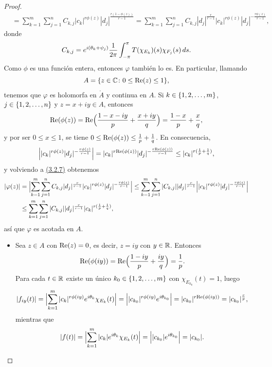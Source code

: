 \documentclass[a4paper, 12pt]{book}
\begin{document}
\begin{proof}
\begin{align}
        &= \sum_{k=1}^m \sum_{j=1}^n C_{k,j} |c_k|^{r\phi(z)} |d_j|^{\frac{r(1-\phi(z))}{r-1}} = \sum_{k=1}^m \sum_{j=1}^n C_{k,j}|d_j|^{\frac{r}{r-1}} |c_k|^{r\phi(z)} |d_j|^{-\frac{r\phi(z)}{r-1}},
    \end{align}
    donde
    \[C_{k,j} = e^{i(\theta_k+\psi_j)}\frac{1}{2\pi}\integral[s]{-\pi}{\pi}{T(\chi_{E_k})(s)\chi_{F_j}(s)}.\]
    Como $\phi$ es una función entera, entonces $\varphi$ también lo es. En particular, llamando
    \[A = \{z \in \C \colon 0 \leq \real(z) \leq 1\},\]
    tenemos que $\varphi$ es holomorfa en $\mathring{A}$ y continua en $A$. Si $k\in \{1,2,\mathellipsis,m\}$, $j \in \{1,2,\mathellipsis,n\}$ y  $z =x+iy\in A$, entonces
    \[\real(\phi(z)) = \real\Bigl(\frac{1-x-iy}{p}+\frac{x+iy}{q}\Bigr) = \frac{1-x}{p}+\frac{x}{q},\]
    y por ser $0 \leq x \leq 1$, se tiene $0 \leq \real(\phi(z)) \leq \frac{1}{p}+\frac{1}{q}$. En consecuencia,
    \begin{align*}
        \Bigl||c_k|^{r\phi(z)} |d_j|^{-\frac{r\phi(z)}{r-1}}\Bigr| = |c_k|^{r\real(\phi(z))}|d_j|^{-\frac{r\real(\phi(z))}{r-1}} \leq |c_k|^{r(\frac{1}{p}+\frac{1}{q})},
    \end{align*} 
    y volviendo a \hyperref[3.2.7]{(3.2.7)} obtenemos
    \begin{align*}
        |\varphi(z)| &= \Bigl|\sum_{k=1}^m \sum_{j=1}^n C_{k,j}|d_j|^{\frac{r}{r-1}} |c_k|^{r\phi(z)} |d_j|^{-\frac{r\phi(z)}{r-1}}\Bigr| \leq\sum_{k=1}^m \sum_{j=1}^n |C_{k,j}||d_j|^{\frac{r}{r-1}} \Bigl||c_k|^{r\phi(z)} |d_j|^{-\frac{r\phi(z)}{r-1}}\Bigr| \\
        &\leq\sum_{k=1}^m \sum_{j=1}^n |C_{k,j}||d_j|^{\frac{r}{r-1}} |c_k|^{r(\frac{1}{p}+\frac{1}{q})},
    \end{align*}
    así que $\varphi$ es acotada en $A$.
    \begin{itemize}
        \item Sea $z \in A$ con $\real(z) = 0$, es decir, $z = iy$ con $y \in \R$. Entonces
        \[\real(\phi(iy)) = \real\Bigl(\frac{1-iy}{p}+\frac{iy}{q}\Bigr) = \frac{1}{p}.\]
        Para cada $t \in \R$ existe un único $k_0 \in \{1,2,\mathellipsis,m\}$ con $\chi_{E_{k_0}}(t) =1$, luego
        \begin{align*}
            |f_{iy}(t)| = \Bigl|\sum_{k=1}^m |c_k|^{r\phi(iy)}e^{i\theta_k}\chi_{E_k}(t)\Bigr| = \Bigl||c_{k_0}|^{r\phi(iy)}e^{i\theta_{k_0}}\Bigr| = |c_{k_0}|^{r\real(\phi(iy))} = |c_{k_0}|^{\frac{r}{p}},
        \end{align*} 
        mientras que
        \[|f(t)| =  \Bigl|\sum_{k=1}^m |c_k|e^{i\theta_k}\chi_{E_k}(t)\Bigr| = \Bigl||c_{k_0}|e^{i\theta_{k_0}}\Bigr| = |c_{k_0}|.\]

\end{itemize}
\end{proof}
\end{document}
